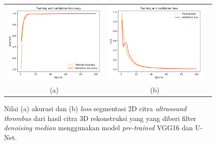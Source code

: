 \begin{enumerate}
	
	\begin{figure}[htbp]
		\centering
		\begin{tabular}{ccc}
			\includegraphics[scale=0.5]{bab4/Rekap Training/VGG16-UNet/median/3/acc_99,74772334098816.png} &
			\includegraphics[scale=0.5]{bab4/Rekap Training/VGG16-UNet/median/3/loss_0,0101.png} & \\
			(a) & (b)    %
		\end{tabular}
		\caption{Nilai (a) akurasi dan (b) \textit{loss} segmentasi 2D citra \textit{ultrasound} \textit{thrombus} dari hasil citra 3D rekonstruksi yang yang diberi filter \textit{denoising} \textit{median} menggunakan model \textit{pre-trained} VGG16 dan U-Net.}
		\label{fig:performance-median-vggunet-rekonstruksi}
	\end{figure}
	


\end{enumerate}

